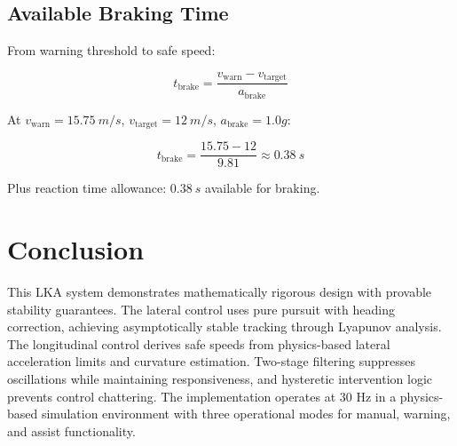 \documentclass[11pt,a4paper]{article}
\begin{document}
\subsection{Available Braking Time}

From warning threshold to safe speed:

\begin{equation}
t_{\text{brake}} = \frac{v_{\text{warn}} - v_{\text{target}}}{a_{\text{brake}}}
\end{equation}

At $v_{\text{warn}} = \SI{15.75}{m/s}$, $v_{\text{target}} = \SI{12}{m/s}$, $a_{\text{brake}} = 1.0g$:

\begin{equation}
t_{\text{brake}} = \frac{15.75 - 12}{9.81} \approx \SI{0.38}{s}
\end{equation}

Plus reaction time allowance: $\SI{0.38}{s}$ available for braking.

\section{Conclusion}

This LKA system demonstrates mathematically rigorous design with provable stability guarantees. The lateral control uses pure pursuit with heading correction, achieving asymptotically stable tracking through Lyapunov analysis. The longitudinal control derives safe speeds from physics-based lateral acceleration limits and curvature estimation. Two-stage filtering suppresses oscillations while maintaining responsiveness, and hysteretic intervention logic prevents control chattering. The implementation operates at 30 Hz in a physics-based simulation environment with three operational modes for manual, warning, and assist functionality.
\end{document}
